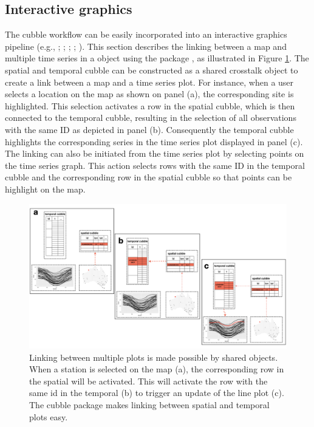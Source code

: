 \documentclass[
  shortnames]{jss}
\begin{document}
\hypertarget{interactive-graphics}{%
\subsection{Interactive graphics}\label{interactive-graphics}}

The cubble workflow can be easily incorporated into an interactive graphics pipeline (e.g., \citet{buja1988elements}; \citet{buja1996interactive}; \citet{sutherland2000orca}; \citet{xie2014reactive}; \citet{cheng2016enabling}). This section describes the linking between a map and multiple time series in a  object using the package  \citep{crosstalk}, as illustrated in Figure \ref{fig:illu-interactive}. The spatial and temporal cubble can be constructed as a shared crosstalk object to create a link between a map and a time series plot. For instance, when a user selects a location on the map as shown on panel (a), the corresponding site is highlighted. This selection activates a row in the spatial cubble, which is then connected to the temporal cubble, resulting in the selection of all observations with the same ID as depicted in panel (b). Consequently the temporal cubble highlights the corresponding series in the time series plot displayed in panel (c). The linking can also be initiated from the time series plot by selecting points on the time series graph. This action selects rows with the same ID in the temporal cubble and the corresponding row in the spatial cubble so that points can be highlight on the map.

\begin{CodeChunk}
\begin{figure}

{\centering \includegraphics[width=1\linewidth,height=0.35\textheight]{figures/diagram-keynotes/‎diagram-keynotes.‎002} 

}

\caption{Linking between multiple plots is made possible by shared  objects. When a station is selected on the map (a), the corresponding row in the spatial  will be activated. This will activate the row with the same id in the temporal  (b) to trigger an update of the line plot (c). The cubble package makes linking between spatial and temporal plots easy.}\label{fig:illu-interactive}
\end{figure}
\end{CodeChunk}
\end{document}
